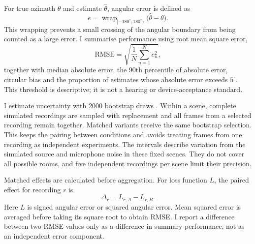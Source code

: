 \documentclass{edpsci}
\begin{document}
For true azimuth $\theta$ and estimate $\widehat{\theta}$, angular error is defined as
\begin{equation}
	e=
	\operatorname{wrap}_{[-180^\circ,180^\circ)}
	\bigl(\widehat{\theta}-\theta\bigr).
	\label{eq:error}
\end{equation}
This wrapping prevents a small crossing of the angular boundary from being counted as a large error. I summarise performance using root mean square error,
\begin{equation}
	\mathrm{RMSE}
	=
	\sqrt{
		\frac{1}{N}
		\sum_{n=1}^{N}e_n^2
	},
\end{equation}
together with median absolute error, the 90th percentile of absolute error, circular bias and the proportion of estimates whose absolute error exceeds $5^\circ$. This threshold is descriptive; it is not a hearing or device-acceptance standard.

I estimate uncertainty with 2000 bootstrap draws \citep{efron}. Within a scene, complete simulated recordings are sampled with replacement and all frames from a selected recording remain together. Matched variants receive the same bootstrap selection. This keeps the pairing between conditions and avoids treating frames from one recording as independent experiments. The intervals describe variation from the simulated source and microphone noise in these fixed scenes. They do not cover all possible rooms, and five independent recordings per scene limit their precision.

Matched effects are calculated before aggregation. For loss function $L$, the paired effect for recording $r$ is
\begin{equation}
	\Delta_r=L_{r,A}-L_{r,B}.
\end{equation}
Here $L$ is signed angular error or squared angular error. Mean squared error is averaged before taking its square root to obtain RMSE. I report a difference between two RMSE values only as a difference in summary performance, not as an independent error component.
\end{document}
